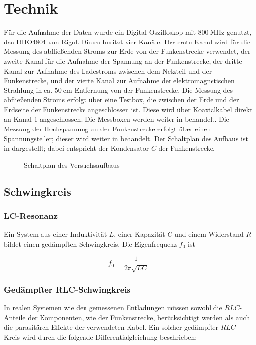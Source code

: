 \section{Technik}
\label{sec:technic}
Für die Aufnahme der Daten wurde ein Digital-Oszilloskop mit \(\SI{800}{\mega\hertz}\) genutzt, das DHO4804 von Rigol. Dieses besitzt vier Kanäle. Der erste Kanal wird für die Messung des abfließenden Stroms zur Erde von der Funkenstrecke verwendet, der zweite Kanal für die Aufnahme der Spannung an der Funkenstrecke, der dritte Kanal zur Aufnahme des Ladestroms zwischen dem Netzteil und der Funkenstrecke, und der vierte Kanal zur Aufnahme der elektromagnetischen Strahlung in ca. \(\SI{50}{\centi\meter}\) Entfernung von der Funkenstrecke. Die Messung des abfließenden Stroms erfolgt über eine Testbox, die zwischen der Erde und der Erdseite der Funkenstrecke angeschlossen ist. Diese wird über Koaxialkabel direkt an Kanal 1 angeschlossen. Die Messboxen werden weiter in  behandelt. Die Messung der Hochspannung an der Funkenstrecke erfolgt über einen Spannungsteiler; dieser wird weiter in  behandelt. Der Schaltplan des Aufbaus ist in  dargestellt; dabei entspricht der Kondensator \(C\) der Funkenstrecke. 

\begin{figure}[H]
    \centering
    
    \caption{Schaltplan des Versuchsaufbaus}
    \label{fig:setup_circuit}
\end{figure}


\subsection{Schwingkreis}

\subsubsection{LC-Resonanz}
Ein System aus einer Induktivität \(L\), einer Kapazität \(C\) und einem Widerstand \(R\) bildet einen gedämpften Schwingkreis. Die Eigenfrequenz \(f_0\) ist

\begin{equation}
f_0 = \frac{1}{2\pi \sqrt{LC}}
\end{equation}

\subsubsection{Gedämpfter RLC-Schwingkreis}
In realen Systemen wie den gemessenen Entladungen müssen sowohl die \(RLC\)- Anteile der Komponenten, wie der Funkenstrecke, berücksichtigt werden als auch die parasitären Effekte der verwendeten Kabel. Ein solcher gedämpfter \(RLC\)-Kreis wird durch die folgende Differentialgleichung beschrieben:

